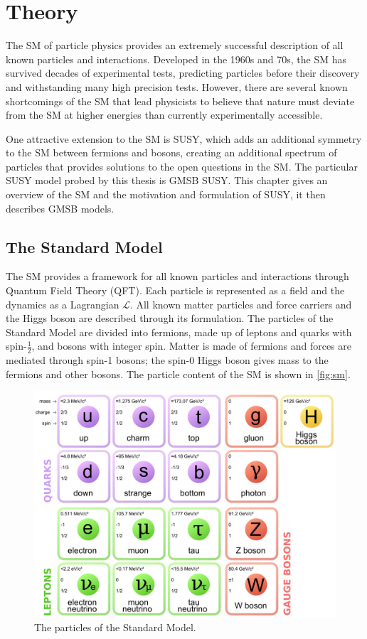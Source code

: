 \chapter{Theory}
\label{chap:theory}

The \acf{SM} of particle physics provides an extremely successful description of all known particles and interactions. Developed in the 1960s and 70s, the \ac{SM} has survived decades of experimental tests, predicting particles before their discovery and withstanding many high precision tests. However, there are several known shortcomings of the \ac{SM} that lead physicists to believe that nature must deviate from the \ac{SM} at higher energies than currently experimentally accessible. 

One attractive extension to the \acf{SM} is \acf{SUSY}, which adds an additional symmetry to the \ac{SM} between fermions and bosons, creating an additional spectrum of particles that provides solutions to the open questions in the \ac{SM}. The particular \ac{SUSY} model probed by this thesis is \acf{GMSB} \ac{SUSY}. This chapter gives an overview of the \ac{SM} and the motivation and formulation of \ac{SUSY}, it then describes \ac{GMSB} models. 


\section{The Standard Model}

The \acf{SM} provides a framework for all known particles and interactions through Quantum Field Theory (QFT). Each particle is represented as a field and the dynamics as a Lagrangian $\mathcal{L}$. All known matter particles and force carriers and the Higgs boson are described through its formulation. The particles of the Standard Model are divided into fermions, made up of leptons and quarks with spin-$\frac{1}{2}$, and bosons with integer spin. Matter is made of fermions and forces are mediated through spin-1 bosons; the spin-0 Higgs boson gives mass to the fermions and other bosons. The particle content of the \ac{SM} is shown in \autoref{fig:sm}. 
 
\begin{figure}[htbp]
\centering
\includegraphics[width=.8\textwidth]{figures/theory/standard-model.jpg}
\caption{The particles of the Standard Model.}
\label{fig:sm}
\end{figure}



